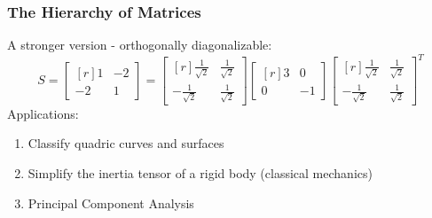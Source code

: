 \documentclass[10pt]{beamer}
\begin{document}
\begin{frame}
\frametitle{The Hierarchy of Matrices}
A stronger version - orthogonally diagonalizable:
\[
S = \begin{bmatrix*}[r]
1&-2\\[1em]
-2&1
\end{bmatrix*} = \begin{bmatrix*}[r]
\frac{1}{\sqrt 2}&\frac{1}{\sqrt 2}\\[1em]
-\frac{1}{\sqrt 2}&\frac{1}{\sqrt 2}
\end{bmatrix*}\begin{bmatrix*}[r]
3&0\\[1em]
0&-1
\end{bmatrix*}\begin{bmatrix*}[r]
\frac{1}{\sqrt 2}&\frac{1}{\sqrt 2}\\[1em]
-\frac{1}{\sqrt 2}&\frac{1}{\sqrt 2}
\end{bmatrix*}^T
\]
\pause
Applications:
\begin{enumerate}[label = {(\alph*)}]
\item Classify quadric curves and surfaces\pause
\item Simplify the inertia tensor of a rigid body (classical mechanics)\pause
\item Principal Component Analysis
\end{enumerate}
\end{frame}
\end{document}
